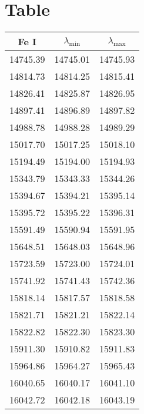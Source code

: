 \documentclass{article}
\begin{document}
\clearpage





\clearpage
\appendix
\section{Table}
\begin{table}[h!]
  \vspace{0.3cm}
  \begin{minipage}[t]{.4\linewidth}
  \begin{center}
    \begin{tabular}{ccc}
          \hline
      \hline
      Fe I & $\lambda_{\mathrm{min}}$ & $\lambda_{\mathrm{max}}$ \\
      \hline
          14745.39 & 14745.01 & 14745.93 \\
          14814.73 & 14814.25 & 14815.41 \\
          14826.41 & 14825.87 & 14826.95 \\
          14897.41 & 14896.89 & 14897.82 \\
          14988.78 & 14988.28 & 14989.29 \\
          15017.70 & 15017.25 & 15018.10 \\
          15194.49 & 15194.00 & 15194.93 \\
          15343.79 & 15343.33 & 15344.26 \\
          15394.67 & 15394.21 & 15395.14 \\
          15395.72 & 15395.22 & 15396.31 \\
          15591.49 & 15590.94 & 15591.95 \\
          15648.51 & 15648.03 & 15648.96 \\
          15723.59 & 15723.00 & 15724.01 \\
          15741.92 & 15741.43 & 15742.36 \\
          15818.14 & 15817.57 & 15818.58 \\
          15821.71 & 15821.21 & 15822.14 \\
          15822.82 & 15822.30 & 15823.30 \\
          15911.30 & 15910.82 & 15911.83 \\
          15964.86 & 15964.27 & 15965.43 \\
          16040.65 & 16040.17 & 16041.10 \\
          16042.72 & 16042.18 & 16043.19 \\

\end{tabular}
\end{center}
\end{minipage}
\end{table}
\end{document}
